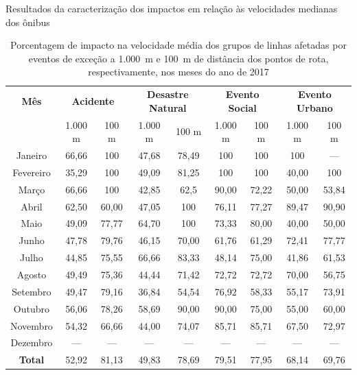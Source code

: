 \documentclass{beamer}
\begin{document}
\begin{frame}{Resultados da caracterização dos impactos em relação às velocidades medianas dos ônibus}
\begin{table}[!htb]
\centering
\caption {Porcentagem de impacto na velocidade média dos grupos de linhas afetadas por eventos de exceção a 1.000~m e 100~m de distância dos pontos de rota, respectivamente, nos meses do ano de 2017}
\label{tab:exceptEventVelocityImpAllShapes}
\begin{adjustbox}{max height=10mm, width=3.5in}
\begin{tabular}{c|cc|cc|cc|cc}
\toprule
\newline \textbf{Mês} & \multicolumn{2}{c}{\textbf{Acidente}} &
\multicolumn{2}{c}{\textbf{Desastre Natural}} & \multicolumn{2}{c}{\textbf{Evento Social}} &
\multicolumn{2}{c}{\textbf{Evento Urbano}}\\
\cmidrule(l){2-3} \cmidrule(l){4-5} \cmidrule(l){6-7} \cmidrule(l){8-9}
 & 1.000 m & 100 m & 1.000 m & 100 m & 1.000 m & 100 m & 1.000 m & 100 m \\
\midrule
Janeiro & 66,66 &  100 & 
 47,68 &  78,49 & 
 100 & 100 &
 100 & --- \\
\hline
Fevereiro & 35,29  &  100 &
 49,09 &  81,25 &
 100 & 100 &
 40,00 & 100 \\
\hline
Março  & 66,66  &  100 & 
 42,85 &  62,5 &
90,00 & 72,22 &
50,00 & 53,84 \\
\hline
Abril & 62,50 & 60,00 & 
47,05  & 100 & 
76,11 & 77,27 & 
89,47 &  90,90\\
\hline
Maio & 49,09 &  77,77 &
64,70 &  100 &
73,33 & 80,00 &
40,00 & 50,00 \\
\hline
Junho & 47,78 &  79,76 &
 46,15 &  70,00 &
 61,76 & 61,29 &
72,41 & 77,77 \\
\hline
Julho & 44,85  &  75,55 &
 66,66  & 83,33 &
48,14  & 75,00 &
41,86 & 61,53 \\
\hline
Agosto & 49,49 & 75,36 &
  44,44 & 71,42 &
  72,72 & 72,72 & 
70,00  & 56,75 \\
\hline
Setembro & 49,47  & 79,16 &
36,84  & 54,54 &
76,92  & 58,33 & 
55,17 & 73,91 \\
\hline
Outubro & 56,06 & 78,26 &
58,69  & 90,00 &
90,00  & 75,00 &
55,00 & 60,00 \\
\hline
Novembro & 54,32 & 66,66 &
 44,00 & 74,07 &
85,71  & 85,71 &
67,50  & 72,97 \\
\hline
Dezembro & --- & --- & --- & --- & --- & --- & --- & ---  \\
\midrule
\midrule
\textbf{\alert{Total}} & \alert{52,92} & \alert{81,13} & \alert{49,83} & \alert{78,69} & \alert{79,51} & \alert{77,95} & \alert{68,14} & \alert{69,76}  \\
\bottomrule
\end{tabular}
\end{adjustbox}
\end{table}
\end{frame}
\end{document}

